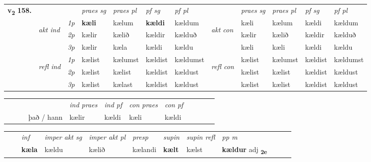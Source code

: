 \begin{tabular}{llllllllllll} \toprule
\multirow{4}{*}{{{\textbf{v{\textsubscript{2}}} \Large{\textbf{158.}}}}}  & &   &  \textit{praes sg}  & \textit{praes pl}  &\textit{ pf sg} & \textit{pf pl} &  &  \textit{praes sg}  & \textit{praes pl}  & \textit{pf sg} & \textit{pf pl } \\*
	\cmidrule{4-7} \cmidrule{9-12}
 & \multirow{3}{*}{\begin{turn}{90}\textit{akt ind}\end{turn}} & {\textit{1p}} & \textbf{kæli} & kælum    & \textbf{kældi} & kældum & \multirow{3}{*}{\begin{turn}{90}\textit{akt con}\end{turn}} &kæli & kælum & kældi & kældum\\*
& &  {\textit{2p}} &  kælir  & kælið   & kældir & kælduð & & kælir & kælið & kældir & kælduð \\*
& &  {\textit{3p}} & kælir & kæla   & kældi & kældu & & kæli & kæli& kældi & kældu  \\*
\cmidrule{4-7} \cmidrule{9-12}
 &\multirow{3}{*}{\begin{turn}{90}\textit{refl ind}\end{turn}} & {\textit{1p}} & kælist & kælumst    & kældist & kældumst & \multirow{3}{*}{\begin{turn}{90}\textit{refl con}\end{turn}}  &kælist & kælumst & kældist & kældumst\\*
 &&  {\textit{2p}} &  kælist  & kælist   & kældist & kældust & &kælist & kælist & kældist & kældust \\*
& &  {\textit{3p}} & kælist & kælast   & kældist & kældust & & kælist & kælist& kældist & kældust  \\*
\cmidrule{4-7} \cmidrule{9-12}
\end{tabular}


\begin{tabular}{llllllllllll}
 & &  & &  \textit{ind praes} & \textit{ind pf} & \textit{con praes} & \textit{con pf} \\*
&  & & það / hann & kælir & kældi & kæli & kældi \\*
\cmidrule{5-9}
\end{tabular}


\begin{tabular}{llllllllllll}
 & & \textit{inf} & \textit{imper akt sg} & \textit{imper akt pl}   & \textit{presp} & \textit{supin} & \textit{supin refl} & \textit{pp m}     \\*
  & & \textbf{kæla} & kældu  & kælið   & kælandi &  \textbf{kælt} & kælst & \textbf{kældur} adj \textbf{\textsubscript{2e}} \\*
\cmidrule{1-12}
\end{tabular}



